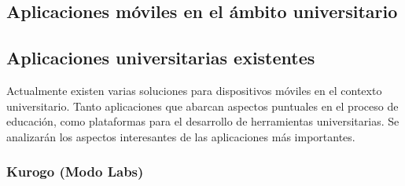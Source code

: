 \subsection{Aplicaciones móviles en el ámbito universitario}
\label{aplicaciones_existentes}

\subsection{Aplicaciones universitarias existentes}
\label{aplicaciones_existentes}

Actualmente existen varias soluciones para dispositivos móviles en el contexto
universitario. Tanto aplicaciones que abarcan aspectos puntuales en el proceso
de educación, como plataformas para el desarrollo de herramientas
universitarias. Se analizarán los aspectos interesantes de las aplicaciones más
importantes.

\subsubsection{Kurogo (Modo Labs)}
\label{aplicaciones_existentes_kurogo}


